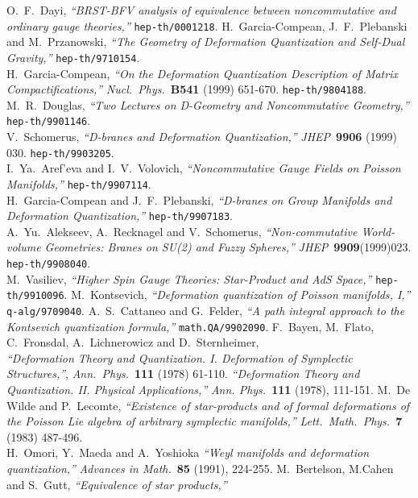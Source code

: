 \documentclass[10pt,a4paper]{article}
\begin{document}
\begin{thebibliography}{99}
O.~F.~Dayi,
{\it ``BRST-BFV analysis of equivalence between noncommutative and ordinary gauge theories,''}
{\tt hep-th/0001218}.
H.~Garcia-Compean, J.~F.~Plebanski and M.~Przanowski,
{\it ``The Geometry of Deformation Quantization and Self-Dual Gravity,''}
{\tt hep-th/9710154}.\\
H.~Garcia-Compean,
{\it ``On the Deformation Quantization Description of Matrix Compactifications,''}
{\sl Nucl.~Phys.}~{\bf B541} (1999) 651-670. 
{\tt hep-th/9804188}.\\
M.~R.~Douglas,
{\it ``Two Lectures on D-Geometry and Noncommutative Geometry,''}
{\tt hep-th/9901146}.\\
V.~Schomerus,
{\it ``D-branes and Deformation Quantization,''}
{\sl JHEP}~{\bf 9906} (1999) 030.
{\tt hep-th/9903205}.\\
I.~Ya.~Aref'eva and I.~V.~Volovich,
{\it ``Noncommutative Gauge Fields on Poisson Manifolds,''}
{\tt hep-th/9907114}.\\
H.~Garcia-Compean and J.~F.~Plebanski,
{\it ``D-branes on Group Manifolds and Deformation Quantization,''}
{\tt hep-th/9907183}.\\
A.~Yu.~Alekseev, A.~Recknagel and V.~Schomerus,
{\it ``Non-commutative World-volume Geometries: Branes on SU(2) and Fuzzy Spheres,''}
{\sl JHEP}~{\bf 9909}(1999)023.
{\tt hep-th/9908040}.\\
M.~Vasiliev,
{\it ``Higher Spin Gauge Theories: Star-Product and AdS Space,''}
{\tt hep-th/9910096}.
M.~Kontsevich,
{\it ``Deformation quantization of Poisson manifolds, I,''}
{\tt q-alg/9709040}.
A.~S.~Cattaneo and G.~Felder,
{\it ``A path integral approach to the Kontsevich quantization formula,''}
{\tt math.QA/9902090}.
F.~Bayen, M.~Flato, C.~Fronsdal, A.~Lichnerowicz and D.~Sternheimer,\\
{\it ``Deformation Theory and Quantization. I. Deformation of Symplectic Structures,''},
{\sl Ann.~Phys.}~{\bf 111} (1978) 61-110.
{\it ``Deformation Theory and Quantization. II. Physical Applications,''}
{\sl Ann. Phys.}~{\bf 111} (1978), 111-151.
M.~De Wilde and P.~Lecomte,
{\it ``Existence of star-products and of formal deformations of the Poisson Lie algebra of arbitrary symplectic manifolds,''}
{\sl Lett.~Math.~Phys.}~{\bf 7} (1983) 487-496.\\
H.~Omori, Y.~Maeda and A.~Yoshioka
{\it ``Weyl manifolds and deformation quantization,''}
{\sl Advances in Math.}~{\bf 85} (1991), 224-255.
M.~Bertelson, M.Cahen and S.~Gutt,
{\it ``Equivalence of star products,''}

\end{thebibliography}
\end{document}
